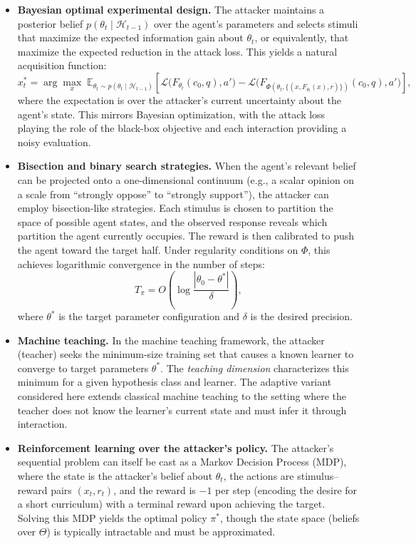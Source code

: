 \begin{itemize}
    \item \textbf{Bayesian optimal experimental design.} The attacker maintains a posterior belief $p(\theta_t \mid \mathcal{H}_{t-1})$ over the agent's parameters and selects stimuli that maximize the expected information gain about $\theta_t$, or equivalently, that maximize the expected reduction in the attack loss. This yields a natural acquisition function:
    \begin{equation}
        x_t^* = \arg\max_{x} \; \mathbb{E}_{\theta_t \sim p(\theta_t \mid \mathcal{H}_{t-1})} \left[ \mathcal{L}\!\bigl(F_{\theta_t}(c_0, q), a'\bigr) - \mathcal{L}\!\bigl(F_{\Phi(\theta_t, \{(x, F_{\theta_t}(x), r)\})}(c_0, q), a'\bigr) \right],
    \end{equation}
    where the expectation is over the attacker's current uncertainty about the agent's state. This mirrors Bayesian optimization, with the attack loss playing the role of the black-box objective and each interaction providing a noisy evaluation.
    
    \item \textbf{Bisection and binary search strategies.} When the agent's relevant belief can be projected onto a one-dimensional continuum (e.g., a scalar opinion on a scale from ``strongly oppose'' to ``strongly support''), the attacker can employ bisection-like strategies. Each stimulus is chosen to partition the space of possible agent states, and the observed response reveals which partition the agent currently occupies. The reward is then calibrated to push the agent toward the target half. Under regularity conditions on $\Phi$, this achieves logarithmic convergence in the number of steps:
    \begin{equation}
        T_\pi = O\!\left(\log \frac{|\theta_0 - \theta^*|}{\delta}\right),
    \end{equation}
    where $\theta^*$ is the target parameter configuration and $\delta$ is the desired precision.
 
    \item \textbf{Machine teaching.} In the machine teaching framework, the attacker (teacher) seeks the minimum-size training set that causes a known learner to converge to target parameters $\theta^*$. The \emph{teaching dimension} characterizes this minimum for a given hypothesis class and learner. The adaptive variant considered here extends classical machine teaching to the setting where the teacher does not know the learner's current state and must infer it through interaction.
 
    \item \textbf{Reinforcement learning over the attacker's policy.} The attacker's sequential problem can itself be cast as a Markov Decision Process (MDP), where the state is the attacker's belief about $\theta_t$, the actions are stimulus--reward pairs $(x_t, r_t)$, and the reward is $-1$ per step (encoding the desire for a short curriculum) with a terminal reward upon achieving the target. Solving this MDP yields the optimal policy $\pi^*$, though the state space (beliefs over $\Theta$) is typically intractable and must be approximated.
\end{itemize}
 
